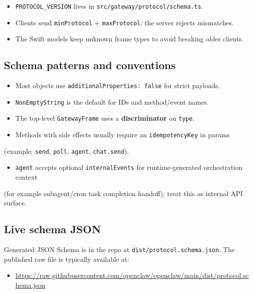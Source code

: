 \begin{itemize}
  \item \texttt{PROTOCOL\_VERSION} lives in \texttt{src/gateway/protocol/schema.ts}.
  \item Clients send \texttt{minProtocol} + \texttt{maxProtocol}; the server rejects mismatches.
  \item The Swift models keep unknown frame types to avoid breaking older clients.
\end{itemize}


\subsection{Schema patterns and conventions}


\begin{itemize}
  \item Most objects use \texttt{additionalProperties: false} for strict payloads.
  \item \texttt{NonEmptyString} is the default for IDs and method/event names.
  \item The top-level \texttt{GatewayFrame} uses a \textbf{discriminator} on \texttt{type}.
  \item Methods with side effects usually require an \texttt{idempotencyKey} in params
\end{itemize}

(example: \texttt{send}, \texttt{poll}, \texttt{agent}, \texttt{chat.send}).
\begin{itemize}
  \item \texttt{agent} accepts optional \texttt{internalEvents} for runtime-generated orchestration context
\end{itemize}

(for example subagent/cron task completion handoff); treat this as internal API surface.

\subsection{Live schema JSON}


Generated JSON Schema is in the repo at \texttt{dist/protocol.schema.json}. The
published raw file is typically available at:

\begin{itemize}
  \item \href{https://raw.githubusercontent.com/openclaw/openclaw/main/dist/protocol.schema.json}{https://raw.githubusercontent.com/openclaw/openclaw/main/dist/protocol.schema.json}
\end{itemize}


